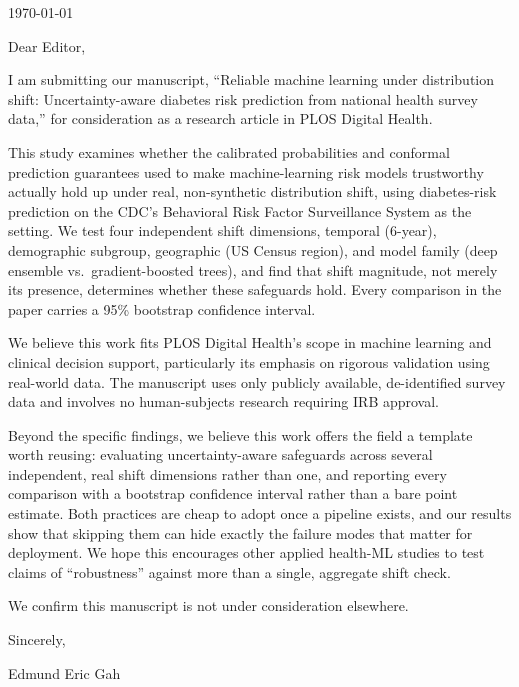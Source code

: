 \documentclass[12pt]{article}
\begin{document}
\today

Dear Editor,

I am submitting our manuscript, ``Reliable machine learning under distribution shift: Uncertainty-aware diabetes risk prediction from national health survey data,'' for consideration as a research article in PLOS Digital Health.

This study examines whether the calibrated probabilities and conformal prediction guarantees used to make machine-learning risk models trustworthy actually hold up under real, non-synthetic distribution shift, using diabetes-risk prediction on the CDC's Behavioral Risk Factor Surveillance System as the setting. We test four independent shift dimensions, temporal (6-year), demographic subgroup, geographic (US Census region), and model family (deep ensemble vs.\ gradient-boosted trees), and find that shift magnitude, not merely its presence, determines whether these safeguards hold. Every comparison in the paper carries a 95\% bootstrap confidence interval.

We believe this work fits PLOS Digital Health's scope in machine learning and clinical decision support, particularly its emphasis on rigorous validation using real-world data. The manuscript uses only publicly available, de-identified survey data and involves no human-subjects research requiring IRB approval.

Beyond the specific findings, we believe this work offers the field a template worth reusing: evaluating uncertainty-aware safeguards across several independent, real shift dimensions rather than one, and reporting every comparison with a bootstrap confidence interval rather than a bare point estimate. Both practices are cheap to adopt once a pipeline exists, and our results show that skipping them can hide exactly the failure modes that matter for deployment. We hope this encourages other applied health-ML studies to test claims of ``robustness'' against more than a single, aggregate shift check.

We confirm this manuscript is not under consideration elsewhere.

Sincerely,

Edmund Eric Gah
\end{document}
